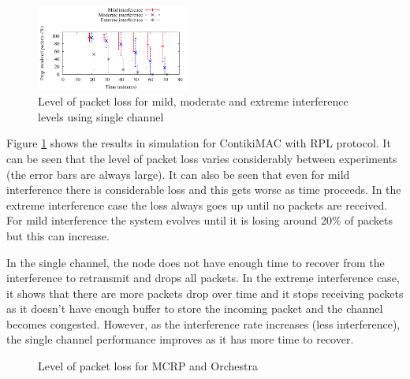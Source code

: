 \begin{figure}
\centering
\includegraphics[width=0.45\textwidth]{figures/single_channel.pdf}
\caption{Level of packet loss for mild, moderate and extreme interference levels using single channel}
\label{fig:interference}
\end{figure}

Figure \ref{fig:interference} shows the results in simulation for ContikiMAC with RPL protocol. It can be seen that the level of packet loss varies considerably between experiments (the error bars are always large). It can also be seen that even for mild interference there is considerable loss and this gets worse as time proceeds. In the extreme interference case the loss always goes up until no packets are received. For mild interference the system evolves until it is losing around 20\% of packets but this can increase.

In the single channel, the node does not have enough time to recover from the interference to retransmit and drops all packets. In the extreme interference case, it shows that there are more packets drop over time and it stops receiving packets as it doesn't have enough buffer to store the incoming packet and the channel becomes congested. However, as the interference rate increases (less interference), the single channel performance improves as it has more time to recover.

\begin{figure}
\centering
{}
\caption{Level of packet loss for MCRP and Orchestra}
\label{fig:layouts}
\end{figure}


